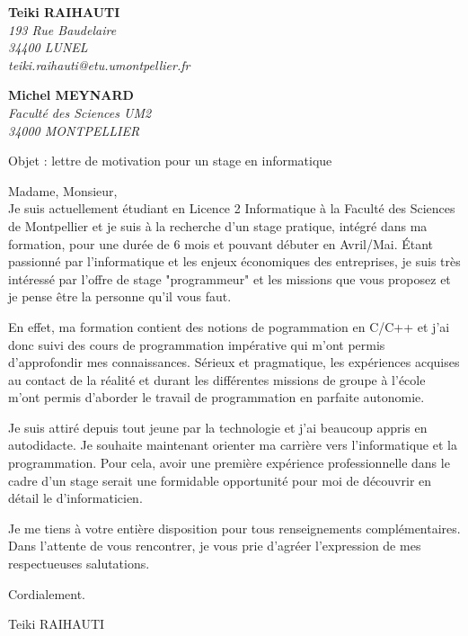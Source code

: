 \documentclass[11pt]{letter}
\begin{document}
\sffamily
\hfill
 
\begin{flushleft}
{\bfseries Teiki RAIHAUTI}\\[.35ex]
\small\itshape
193 Rue Baudelaire\\
34400 LUNEL\\[.35ex]
teiki.raihauti@etu.umontpellier.fr
\end{flushleft}
 
\begin{flushright}
{\bfseries Michel MEYNARD}\\[.35ex]
\small\itshape
Faculté des Sciences UM2\\
34000 MONTPELLIER
\end{flushright}

\begin{flushright}
\end{flushright}
 

Objet : lettre de motivation pour un stage en informatique

Madame, Monsieur,\\
Je suis actuellement étudiant en Licence 2 Informatique à la Faculté des Sciences de Montpellier et je suis à la recherche d’un stage pratique, intégré dans ma formation, pour une durée de 6 mois et pouvant débuter en Avril/Mai. Étant passionné par l'informatique et les enjeux économiques des entreprises, je suis très intéressé par l’offre de stage "programmeur" et les missions que vous proposez et je pense être la personne qu’il vous faut.

En effet, ma formation contient des notions de pogrammation en C/C++ et j’ai donc suivi des cours de programmation impérative qui m’ont permis d’approfondir mes connaissances. Sérieux et pragmatique, les expériences acquises au contact de la réalité et durant les différentes missions de groupe à l’école m’ont permis d’aborder le travail de programmation en parfaite autonomie.

Je suis attiré depuis tout jeune par la technologie et j'ai beaucoup appris en autodidacte. Je souhaite maintenant orienter ma carrière vers l'informatique et la programmation. Pour cela, avoir une première expérience professionnelle dans le cadre d'un stage serait une formidable opportunité pour moi de découvrir en détail le d'informaticien.

Je me tiens à votre entière disposition pour tous renseignements complémentaires.
Dans l’attente de vous rencontrer, je vous prie d'agréer l'expression de mes respectueuses salutations.

Cordialement.\\

\hfill
\begin{flushright}
Teiki RAIHAUTI 
\end{flushright}


\vfill
\end{document}
